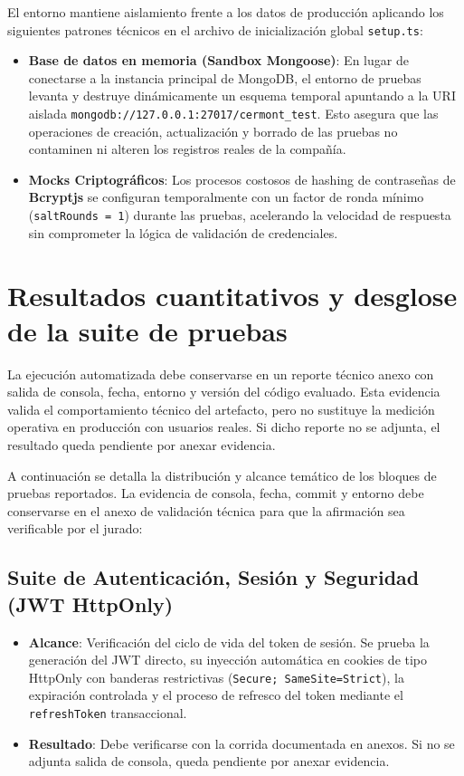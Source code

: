 

El entorno mantiene aislamiento frente a los datos de producción aplicando los siguientes patrones técnicos en el archivo de inicialización global \texttt{setup.ts}:
\begin{itemize}
    \item \textbf{Base de datos en memoria (Sandbox Mongoose)}: En lugar de conectarse a la instancia principal de MongoDB, el entorno de pruebas levanta y destruye dinámicamente un esquema temporal apuntando a la URI aislada \texttt{mongodb://127.0.0.1:27017/cermont\_test}. Esto asegura que las operaciones de creación, actualización y borrado de las pruebas no contaminen ni alteren los registros reales de la compañía.
    \item \textbf{Mocks Criptográficos}: Los procesos costosos de hashing de contraseñas de \textbf{Bcryptjs} se configuran temporalmente con un factor de ronda mínimo (\texttt{saltRounds = 1}) durante las pruebas, acelerando la velocidad de respuesta sin comprometer la lógica de validación de credenciales.
\end{itemize}

\section{Resultados cuantitativos y desglose de la suite de pruebas}
\label{sec:resultados-pruebas}

La ejecución automatizada debe conservarse en un reporte técnico anexo con salida de consola, fecha, entorno y versión del código evaluado. Esta evidencia valida el comportamiento técnico del artefacto, pero no sustituye la medición operativa en producción con usuarios reales. Si dicho reporte no se adjunta, el resultado queda pendiente por anexar evidencia.

A continuación se detalla la distribución y alcance temático de los bloques de pruebas reportados. La evidencia de consola, fecha, commit y entorno debe conservarse en el anexo de validación técnica para que la afirmación sea verificable por el jurado:

\subsection{Suite de Autenticación, Sesión y Seguridad (JWT HttpOnly)}
\begin{itemize}
    \item \textbf{Alcance}: Verificación del ciclo de vida del token de sesión. Se prueba la generación del JWT directo, su inyección automática en cookies de tipo HttpOnly con banderas restrictivas (\texttt{Secure; SameSite=Strict}), la expiración controlada y el proceso de refresco del token mediante el \texttt{refreshToken} transaccional.
    \item \textbf{Resultado}: Debe verificarse con la corrida documentada en anexos. Si no se adjunta salida de consola, queda pendiente por anexar evidencia.
\end{itemize}

